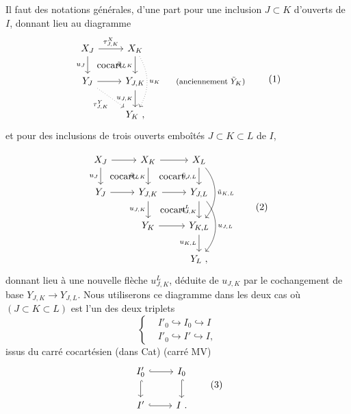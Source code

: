 Il faut des notations générales, d'une part pour une inclusion $J \subset K$ d'ouverts de $I$, donnant lieu au diagramme
\[
\begin{tikzcd}
X_J \arrow[r, "\tau^X_{J,K}"] \arrow[d, "u_J"'] \arrow[dr, phantom, "\cocart"] & X_K \arrow[d, "\tilde{u}_{J,K}"'] \arrow[dd, dotted, bend left=30, "u_K"] & \\
Y_J \arrow[r] \arrow[dr, dotted, "\tau^Y_{J,K}"'] & Y_{J,K} \arrow[d, "u_{J,K}"'] & \text{\footnotesize (anciennement $\tilde{Y}_K$)} \\
& Y_K\ , &
\end{tikzcd}
\tag*{(1)}
\]
et pour des inclusions de trois ouverts emboîtés $J \subset K \subset L$ de $I$,

\[
\begin{tikzcd}
X_J \arrow[r] \arrow[d, "u_J"'] \arrow[dr, phantom, "\cocart"] & X_K \arrow[r] \arrow[d, "\tilde{u}_{J,K}"'] \arrow[dr, phantom, "\cocart"] & X_L \arrow[d, "\tilde{u}_{J,L}"'] \arrow[dd, bend left=40, "\tilde{u}_{K,L}"] \\
Y_J \arrow[r] & Y_{J,K} \arrow[r] \arrow[d, "u_{J,K}"'] \arrow[dr, phantom, "\cocart"] & Y_{J,L} \arrow[d, "u^L_{J,K}"'] \arrow[dd, bend left=40, "u_{J,L}"] \\
 & Y_K \arrow[r] & Y_{K,L} \arrow[d, "u_{K,L}"'] \\
 & & Y_L\ ,
\end{tikzcd}
\tag*{(2)}
\]
donnant lieu à une nouvelle flèche $u^L_{J,K}$, déduite de $u_{J,K}$ par le cochangement de base  $Y_{J,K} \longrightarrow Y_{J,L}$. Nous utiliserons ce diagramme dans les deux cas où $(J \subset K \subset L)$ est l'un des deux triplets
\[
\left\{
\begin{aligned}
& I'_0 \hookrightarrow I_0 \hookrightarrow I \\
& I'_0 \hookrightarrow I' \hookrightarrow I,
\end{aligned}
\right.
\]
issus du carré cocartésien (dans Cat) (carré MV)
\[
\begin{tikzcd}
I'_0 \arrow[r, hook] \arrow[d, hook] & I_0 \arrow[d, hook] \\
I' \arrow[r, hook] & I\ .
\end{tikzcd}
\tag*{(3)}
\]

